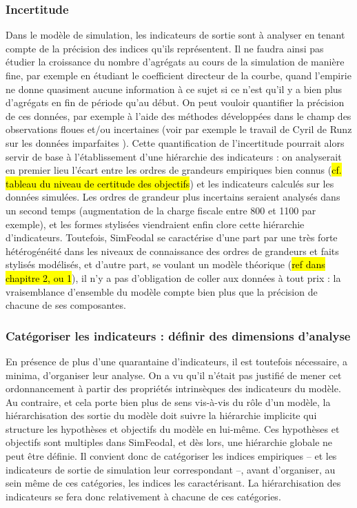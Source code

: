 \subsubsection{Incertitude}\label{sssec:incertitude}
Dans le modèle de simulation, les indicateurs de sortie sont à analyser en tenant compte de la précision des indices qu'ils représentent.
Il ne faudra ainsi pas étudier la croissance du nombre d'agrégats au cours de la simulation de manière fine, par exemple en étudiant le coefficient directeur de la courbe, quand l'empirie ne donne quasiment aucune information à ce sujet si ce n'est qu'il y a bien plus d'agrégats en fin de période qu'au début.
On peut vouloir quantifier la précision de ces données, par exemple à l'aide des méthodes développées dans le champ des observations floues et/ou incertaines (voir par exemple le travail de Cyril de Runz sur les données \og imparfaites\fg{} \autocite{de2008imperfection}).
Cette quantification de l'incertitude pourrait alors servir de base à l'établissement d'une hiérarchie des indicateurs :
on analyserait en premier lieu l'écart entre les ordres de grandeurs empiriques bien connus (\hl{cf. tableau du niveau de certitude des objectifs}) et les indicateurs calculés sur les données simulées.
Les ordres de grandeur plus incertains seraient analysés dans un second temps (augmentation de la charge fiscale entre 800 et 1100 par exemple), et les formes stylisées viendraient enfin clore cette hiérarchie d'indicateurs.
Toutefois, SimFeodal se caractérise d'une part par une très forte hétérogénéité dans les niveaux de connaissance des ordres de grandeurs et faits stylisés modélisés, et d'autre part, se voulant un modèle théorique (\hl{ref dans chapitre 2, ou 1}), il n'y a pas d'obligation de \og coller aux données\fg{} à tout prix :
la vraisemblance d'ensemble du modèle compte bien plus que la précision de chacune de ses composantes.


\subsubsection{Catégoriser les indicateurs : définir des dimensions d'analyse}
En présence de plus d'une quarantaine d'indicateurs, il est toutefois nécessaire, a minima, d'organiser leur analyse.
On a vu qu'il n'était pas justifié de mener cet ordonnancement à partir des propriétés intrinsèques des indicateurs du modèle.
Au contraire, et cela porte bien plus de sens vis-à-vis du rôle d'un modèle, la hiérarchisation des sortie du modèle doit suivre la hiérarchie implicite qui structure les hypothèses et objectifs du modèle en lui-même.
Ces hypothèses et objectifs sont multiples dans SimFeodal, et dès lors, une hiérarchie globale ne peut être définie.
Il convient donc de catégoriser les indices empiriques -- et les indicateurs de sortie de simulation leur correspondant --, avant d'organiser, au sein même de ces catégories, les indices les caractérisant.
La hiérarchisation des indicateurs se fera donc relativement à chacune de ces catégories.

